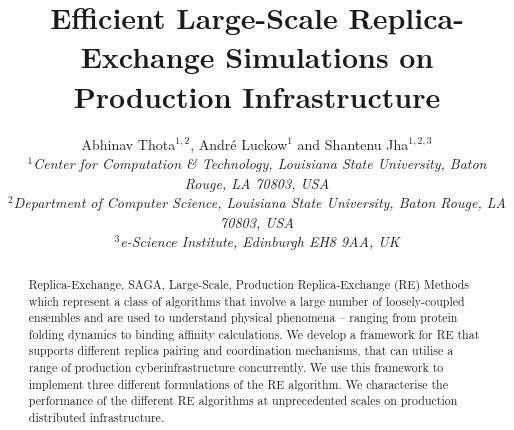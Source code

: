 \documentclass{rspublic}
\title[Efficient Large-Scale Replica-Exchange Simulations on
Production Infrastructure]{Efficient Large-Scale Replica-Exchange
  Simulations on Production Infrastructure}
\author[Thota, Luckow, Jha]{
  Abhinav Thota$^{1,2}$, Andr\'e Luckow$^{1}$ and Shantenu Jha$^{1,2,3}$\\
  \small{\emph{$^{1}$Center for Computation \& Technology, Louisiana State University, Baton Rouge, LA 70803, USA}}\\
  \small{\emph{$^{2}$Department of Computer Science, Louisiana State
      University, Baton Rouge, LA 70803, USA}}\\
  \small{\emph{$^{3}$e-Science Institute, Edinburgh EH8 9AA, UK}}\\
}
\begin{document}
 


\maketitle    

\begin{abstract}{Replica-Exchange, SAGA, Large-Scale, Production}  
  Replica-Exchange (RE) Methods which represent a class of algorithms
  that involve a large number of loosely-coupled ensembles and are
  used to understand physical phenomena -- ranging from protein
  folding dynamics to binding affinity calculations.  We develop a
  framework for RE that supports different replica pairing and
  coordination mechanisms, that can utilise a range of production
  cyberinfrastructure concurrently.  We use this framework to
  implement three different formulations of the RE algorithm.  We
  characterise the performance of the different RE algorithms at
  unprecedented scales on production distributed infrastructure.




\end{abstract}
\end{document}
